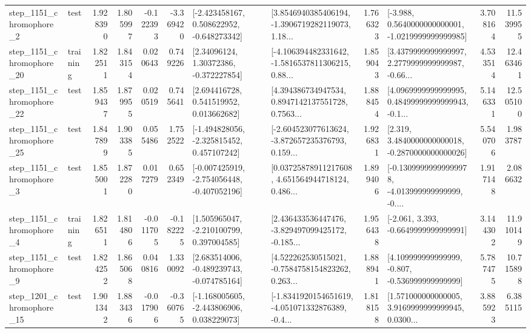 \begin{tabular}{llrrrrllrlrr}
  step\_1151\_chromophore\_2 &      test &      1.928390 &    1.805997 &     -0.122393 & -3.369420 &   [-2.423458167, 0.508622952, -0.648273342] &  [3.8546940385406194, -1.3906719282119073, 1.18... &       1.766323 &  [-3.988, 0.5640000000000001, -1.0219999999999985] &            3.708164 &         11.539955 \\
 step\_1151\_chromophore\_20 &  training &      1.822511 &    1.843154 &      0.020643 &  0.749226 &      [2.34096124, 1.30372386, -0.372227854] &  [-4.106394482331642, -1.5816537811306215, 0.88... &       1.859043 &  [3.4379999999999997, 2.2779999999999987, -0.66... &            4.533514 &         12.463461 \\
 step\_1151\_chromophore\_22 &      test &      1.859437 &    1.879955 &      0.020519 &  0.745641 &     [2.694416728, 0.541519952, 0.013662682] &  [4.394386734947534, 0.8947142137551728, 0.7563... &       1.888454 &  [4.0969999999999995, 0.48499999999999943, -0.1... &            5.146331 &         12.505100 \\
 step\_1151\_chromophore\_25 &      test &      1.847899 &    1.903385 &      0.055486 &  1.752522 &   [-1.494828056, -2.325815452, 0.457107242] &  [-2.604523077613624, -3.872657235376793, 0.159... &       1.926831 &   [2.319, 3.4840000000000018, -0.2870000000000026] &            5.540706 &          1.983787 \\
  step\_1151\_chromophore\_3 &      test &      1.855001 &    1.872280 &      0.017279 &  0.652349 &  [-0.007425919, -2.754056448, -0.407052196] &  [0.03725878911217608, 4.651564944718124, 0.486... &       1.899406 &  [-0.13099999999999978, -4.013999999999999, -0.... &            1.917148 &          2.086632 \\
  step\_1151\_chromophore\_4 &  training &      1.826511 &    1.814806 &     -0.011705 & -0.182225 &    [1.505965047, -2.210100799, 0.397004585] &  [2.436433536447476, -3.829497099425172, -0.185... &       1.956438 &               [-2.061, 3.393, -0.6649999999999991] &            3.144302 &         11.910149 \\
  step\_1151\_chromophore\_9 &      test &      1.824252 &    1.865068 &      0.040816 &  1.330092 &   [2.683514006, -0.489239743, -0.074785164] &  [4.522262530515021, -0.7584758154823262, 0.263... &       1.888941 &    [4.109999999999999, -0.807, -0.536999999999999] &            5.787475 &         10.715898 \\
 step\_1201\_chromophore\_15 &      test &      1.901342 &    1.883436 &     -0.017906 & -0.360765 &   [-1.168005605, -2.443806906, 0.038229073] &  [-1.8341920154651619, -4.051071332876389, -0.4... &       1.818158 &  [1.571000000000005, 3.9169999999999945, 0.0300... &            3.885923 &          6.385115 \\

\end{tabular}
